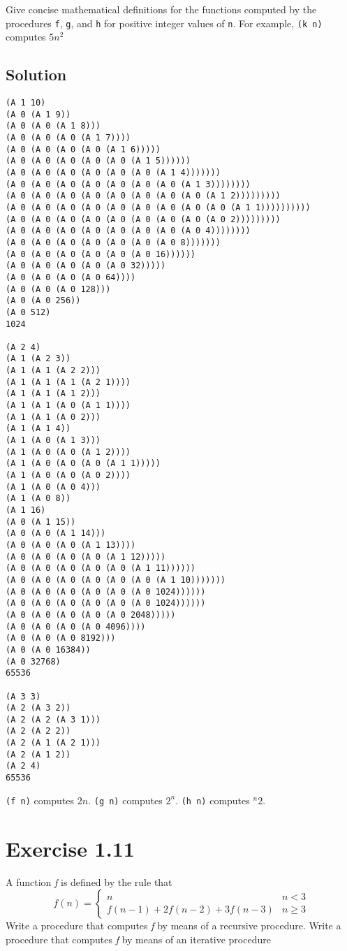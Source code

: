 \documentclass[11pt]{article}
\begin{document}
Give concise mathematical definitions for the functions computed by the
procedures \texttt{f}, \texttt{g}, and \texttt{h} for positive integer values of \texttt{n}. For example,
\texttt{(k n)} computes \(5n^2\)

\subsection{Solution}
\label{sec:org77f5864}
\begin{verbatim}
(A 1 10)
(A 0 (A 1 9))
(A 0 (A 0 (A 1 8)))
(A 0 (A 0 (A 0 (A 1 7))))
(A 0 (A 0 (A 0 (A 0 (A 1 6)))))
(A 0 (A 0 (A 0 (A 0 (A 0 (A 1 5))))))
(A 0 (A 0 (A 0 (A 0 (A 0 (A 0 (A 1 4)))))))
(A 0 (A 0 (A 0 (A 0 (A 0 (A 0 (A 0 (A 1 3))))))))
(A 0 (A 0 (A 0 (A 0 (A 0 (A 0 (A 0 (A 0 (A 1 2)))))))))
(A 0 (A 0 (A 0 (A 0 (A 0 (A 0 (A 0 (A 0 (A 0 (A 1 1))))))))))
(A 0 (A 0 (A 0 (A 0 (A 0 (A 0 (A 0 (A 0 (A 0 2)))))))))
(A 0 (A 0 (A 0 (A 0 (A 0 (A 0 (A 0 (A 0 4))))))))
(A 0 (A 0 (A 0 (A 0 (A 0 (A 0 (A 0 8)))))))
(A 0 (A 0 (A 0 (A 0 (A 0 (A 0 16))))))
(A 0 (A 0 (A 0 (A 0 (A 0 32)))))
(A 0 (A 0 (A 0 (A 0 64))))
(A 0 (A 0 (A 0 128)))
(A 0 (A 0 256))
(A 0 512)
1024

(A 2 4)
(A 1 (A 2 3))
(A 1 (A 1 (A 2 2)))
(A 1 (A 1 (A 1 (A 2 1))))
(A 1 (A 1 (A 1 2)))
(A 1 (A 1 (A 0 (A 1 1))))
(A 1 (A 1 (A 0 2)))
(A 1 (A 1 4))
(A 1 (A 0 (A 1 3)))
(A 1 (A 0 (A 0 (A 1 2))))
(A 1 (A 0 (A 0 (A 0 (A 1 1)))))
(A 1 (A 0 (A 0 (A 0 2))))
(A 1 (A 0 (A 0 4)))
(A 1 (A 0 8))
(A 1 16)
(A 0 (A 1 15))
(A 0 (A 0 (A 1 14)))
(A 0 (A 0 (A 0 (A 1 13))))
(A 0 (A 0 (A 0 (A 0 (A 1 12)))))
(A 0 (A 0 (A 0 (A 0 (A 0 (A 1 11))))))
(A 0 (A 0 (A 0 (A 0 (A 0 (A 0 (A 1 10)))))))
(A 0 (A 0 (A 0 (A 0 (A 0 (A 0 1024))))))
(A 0 (A 0 (A 0 (A 0 (A 0 (A 0 1024))))))
(A 0 (A 0 (A 0 (A 0 (A 0 2048)))))
(A 0 (A 0 (A 0 (A 0 4096))))
(A 0 (A 0 (A 0 8192)))
(A 0 (A 0 16384))
(A 0 32768)
65536

(A 3 3)
(A 2 (A 3 2))
(A 2 (A 2 (A 3 1)))
(A 2 (A 2 2))
(A 2 (A 1 (A 2 1)))
(A 2 (A 1 2))
(A 2 4)
65536
\end{verbatim}

\texttt{(f n)} computes \(2n\).
\texttt{(g n)} computes \(2^n\).
\texttt{(h n)} computes \(^n2\).

\section{Exercise 1.11}
\label{sec:orgdd8356f}
A function \emph{f} is defined by the rule that
\begin{equation}
f(n)=
\begin{cases}
n & n<3 \\ f(n-1) + 2f(n-2) + 3f(n-3) & n\geq 3
\end{cases}
\end{equation}
Write a procedure that computes \emph{f} by means of a recursive procedure. Write a
procedure that computes \emph{f} by means of an iterative procedure
\end{document}
